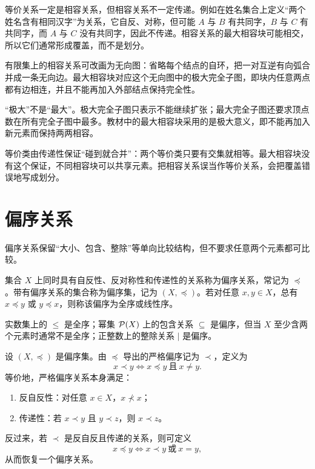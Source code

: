 等价关系一定是相容关系，但相容关系不一定传递。例如在姓名集合上定义“两个姓名含有相同汉字”为关系，它自反、对称，但可能 $A$ 与 $B$ 有共同字，$B$ 与 $C$ 有共同字，而 $A$ 与 $C$ 没有共同字，因此不传递。相容关系的最大相容块可能相交，所以它们通常形成覆盖，而不是划分。

\begin{method}[最大相容块的图判定]\label{ch2-compatible-block-method}
有限集上的相容关系可改画为无向图：省略每个结点的自环，把一对互逆有向弧合并成一条无向边。最大相容块对应这个无向图中的极大完全子图，即块内任意两点都有边相连，并且不能再加入外部结点保持完全性。
\end{method}

“极大”不是“最大”。极大完全子图只表示不能继续扩张；最大完全子图还要求顶点数在所有完全子图中最多。教材中的最大相容块采用的是极大意义，即不能再加入新元素而保持两两相容。

\begin{pitfall}[等价类与相容块的差别]\label{ch2-equivalence-compatibility-pitfall}
等价类由传递性保证“碰到就合并”：两个等价类只要有交集就相等。最大相容块没有这个保证，不同相容块可以共享元素。把相容关系误当作等价关系，会把覆盖错误地写成划分。
\end{pitfall}

\section{偏序关系}

偏序关系保留“大小、包含、整除”等单向比较结构，但不要求任意两个元素都可比较。

\begin{definition}[偏序、偏序集与全序]\label{ch2-poset}
集合 $X$ 上同时具有自反性、反对称性和传递性的关系称为偏序关系，常记为 $\preceq$。带有偏序关系的集合称为偏序集，记为 $(X,\preceq)$。若对任意 $x,y\in X$，总有 $x\preceq y$ 或 $y\preceq x$，则称该偏序为全序或线性序。
\end{definition}

实数集上的 $\le$ 是全序；幂集 $\mathcal P(X)$ 上的包含关系 $\subseteq$ 是偏序，但当 $X$ 至少含两个元素时通常不是全序；正整数上的整除关系 $\mid$ 是偏序。

\begin{definition}[严格偏序]\label{ch2-strict-poset}
设 $(X,\preceq)$ 是偏序集。由 $\preceq$ 导出的严格偏序记为 $\prec$，定义为
\[
  x\prec y
  \Longleftrightarrow
  x\preceq y\ \text{且}\ x\ne y.
\]
等价地，严格偏序关系本身满足：
\begin{enumerate}
  \item 反自反性：对任意 $x\in X$，$x\not\prec x$；
  \item 传递性：若 $x\prec y$ 且 $y\prec z$，则 $x\prec z$。
\end{enumerate}
反过来，若 $\prec$ 是反自反且传递的关系，则可定义
\[
  x\preceq y
  \Longleftrightarrow
  x\prec y\ \text{或}\ x=y,
\]
从而恢复一个偏序关系。
\end{definition}

